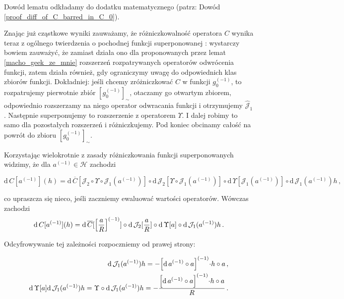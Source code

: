 Dowód lematu odkładamy do dodatku matematycznego (patrz: Dowód \ref{proof_diff_of_C_barred_in_C_0}).

Znając już cząstkowe wyniki zauważamy, że różniczkowalność operatora $C$ wynika teraz z ogólnego twierdzenia o pochodnej funkcji superponowanej \citet[][twr. VII.4.2, str. 152]{Maurin}: wystarczy bowiem zauważyć, że zamiast działa ono dla proponowanych przez lemat \ref{macho_geek_ze_mnie} rozszerzeń rozpatrywanych operatorów odwrócenia funkcji, zatem działa również, gdy ograniczymy uwagę do odpowiednich klas zbiorów funkcji. Dokładniej: jeśli chcemy zróżniczkować $C$ w funkcji $g_{0}^{(-1)}$, to rozpatrujemy pierwotnie zbiór $[g_{0}^{(-1)}]_{\sim}$, otaczamy go otwartym zbiorem, odpowiednio rozszerzamy na niego operator odwracania funkcji i otrzymujemy $\hat{\mathcal{J}}_1$. Następnie superponujemy to rozszerzenie z operatorem $\Upsilon$. I dalej robimy to samo dla pozostałych rozszerzeń i różniczkujemy. Pod koniec obcinamy całość na powrót do zbioru $[g_{0}^{(-1)}]_{\sim}$.

Korzystając wielokrotnie z zasady różniczkowania funkcji superponowanych widzimy, że dla $a^{(-1)} \in \mathcal{H}$ zachodzi

\begin{equation*}
	\mathrm{d}\, C[a^{(-1)}](h) = \mathrm{d}\, \overline{C}[\mathcal{J}_2 \circ \Upsilon \circ \mathcal{J}_1(a^{(-1)})] \circ \mathrm{d}\, \mathcal{J}_2 [\Upsilon \circ \mathcal{J}_1(a^{(-1)})] \circ \mathrm{d}\, \Upsilon  [\mathcal{J}_1(a^{(-1)})] \circ \mathrm{d}\, \mathcal{J}_1(a^{(-1)}) h\,,
\end{equation*}

co upraszcza się nieco, jeśli zaczniemy ewaluować wartości operatorów. Wówczas zachodzi
\begin{equation*}
	\mathrm{d}\, C[a^{(-1)}](h) = \mathrm{d}\, \overline{C}[\Bigl[ \frac{a}{R}\Bigl]^{(-1)}] \circ \mathrm{d}\, \mathcal{J}_2 [\frac{a}{R}] \circ \mathrm{d}\, \Upsilon  [a] \circ \mathrm{d}\, \mathcal{J}_1(a^{(-1)}) h\,.
\end{equation*}

Odcyfrowywanie tej zależności rozpoczniemy od prawej strony:

\begin{align*}
\mathrm{d}\, \mathcal{J}_1(a^{(-1)}) h = -\Bigl[\mathrm{d}\,a^{(-1)} \circ a\Bigl]^{(-1)} \cdot h \circ a\,, \\
\mathrm{d}\, \Upsilon  [a] \mathrm{d}\, \mathcal{J}_1(a^{(-1)}) h = \Upsilon \circ \mathrm{d}\, \mathcal{J}_1(a^{(-1)}) h = -\frac{\Bigl[\mathrm{d}\,a^{(-1)} \circ a\Bigl]^{(-1)} \cdot h \circ a}{R} \,. \\
\end{align*}

